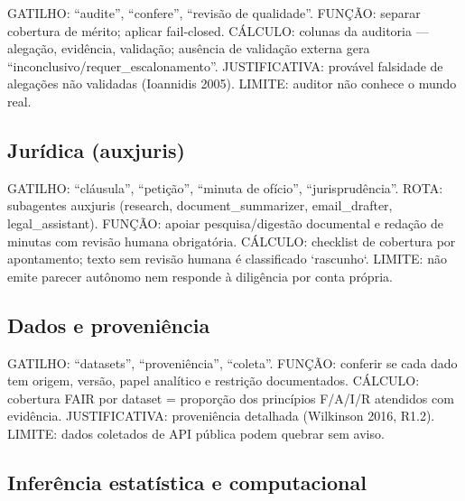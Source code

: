\begin{descricao}
GATILHO: ``audite'', ``confere'', ``revisão de qualidade''. FUNÇÃO: separar
cobertura de mérito; aplicar fail-closed. CÁLCULO: colunas da auditoria —
alegação, evidência, validação; ausência de validação externa gera
``inconclusivo/requer\_escalonamento''. JUSTIFICATIVA: provável falsidade de
alegações não validadas (Ioannidis 2005). LIMITE: auditor não conhece o
mundo real.
\end{descricao}

\subsection{Jurídica (auxjuris)}

\begin{descricao}
GATILHO: ``cláusula'', ``petição'', ``minuta de ofício'', ``jurisprudência''.
ROTA: subagentes auxjuris (research, document\_summarizer, email\_drafter,
legal\_assistant). FUNÇÃO: apoiar pesquisa/digestão documental e redação de
minutas com revisão humana obrigatória. CÁLCULO: checklist de cobertura por
apontamento; texto sem revisão humana é classificado `rascunho`. LIMITE: não
emite parecer autônomo nem responde à diligência por conta própria.
\end{descricao}

\subsection{Dados e proveniência}

\begin{descricao}
GATILHO: ``datasets'', ``proveniência'', ``coleta''. FUNÇÃO: conferir se
cada dado tem origem, versão, papel analítico e restrição documentados.
CÁLCULO: cobertura FAIR por dataset = proporção dos princípios F/A/I/R
atendidos com evidência. JUSTIFICATIVA: proveniência detalhada (Wilkinson
2016, R1.2). LIMITE: dados coletados de API pública podem quebrar sem aviso.
\end{descricao}

\subsection{Inferência estatística e computacional}

